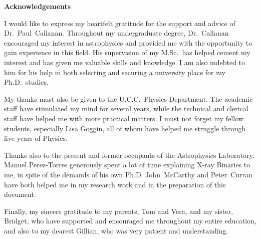 
\begin{center}
\Large{\textbf{Acknowledgements}}
\end{center}

\vspace{\myparskip}

I would like to express my heartfelt gratitude for the support and
advice of Dr.~Paul~Callanan. Throughout my undergraduate degree,
Dr.~Callanan encouraged my interest in astrophysics and provided me
with the opportunity to gain experience in this field. His supervision
of my M.Sc.\ has helped cement my interest and has given me valuable
skills and knowledge. I am also indebted to him for his help in both
selecting and securing a university place for my Ph.D.\ studies. %

\vspace{\myparskip}

My thanks must also be given to the U.C.C.\ Physics Department. The
academic staff have stimulated my mind for several years, while the
technical and clerical staff have helped me with more practical
matters. I must not forget my fellow students, especially Lisa Goggin,
all of whom have helped me struggle through five years of Physics. %

\vspace{\myparskip}

Thanks also to the present and former occupants of the Astrophysics
Laboratory. Manuel Perez-Torres generously spent a lot of time
explaining X-ray Binaries to me, in spite of the demands of his own
Ph.D. John~McCarthy and Peter~Curran have both helped
me in my research work and in the preparation of this document. %

\vspace{\myparskip}

Finally, my sincere gratitude to my parents, Tom and Vera, and my
sister, Bridget, who have supported and encouraged me throughout my
entire education, and also to my dearest Gillian, who was very
patient and understanding. %

